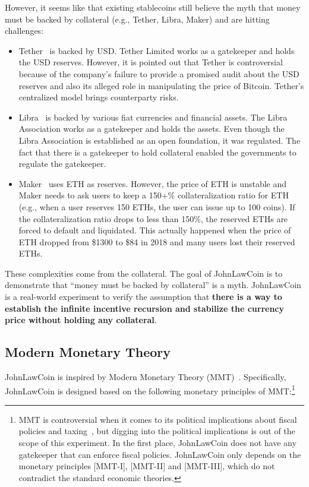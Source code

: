 \documentclass[dvipdfmx,a4paper]{article}
\begin{document}
However, it seems like that existing stablecoins still believe the myth that money must be backed by collateral (e.g., Tether, Libra, Maker) and are hitting challenges:

\begin{itemize}
\item Tether~\cite{tether} is backed by USD. Tether Limited works as a gatekeeper and holds the USD reserves. However, it is pointed out that Tether is controversial because of the company's failure to provide a promised audit about the USD reserves and also its alleged role in manipulating the price of Bitcoin. Tether's centralized model brings counterparty risks.
\item Libra~\cite{libra} is backed by various fiat currencies and financial assets. The Libra Association works as a gatekeeper and holds the assets. Even though the Libra Association is established as an open foundation, it was regulated. The fact that there is a gatekeeper to hold collateral enabled the governments to regulate the gatekeeper.
\item Maker~\cite{makerdao} uses ETH as reserves. However, the price of ETH is unstable and Maker needs to ask users to keep a 150+\% collateralization ratio for ETH (e.g., when a user reserves 150 ETHs, the user can issue up to 100 coins). If the collateralization ratio drops to less than 150\%, the reserved ETHs are forced to default and liquidated. This actually happened when the price of ETH dropped from \$1300 to \$84 in 2018 and many users lost their reserved ETHs.
\end{itemize}

These complexities come from the collateral. The goal of JohnLawCoin is to demonstrate that ``money must be backed by collateral'' is a myth. JohnLawCoin is a real-world experiment to verify the assumption that \textbf{there is a way to establish the infinite incentive recursion and stabilize the currency price without holding any collateral}.

\subsection{Modern Monetary Theory}

JohnLawCoin is inspired by Modern Monetary Theory (MMT)~\cite{kelton2020deficit,mmt2016wray}. Specifically, JohnLawCoin is designed based on the following monetary principles of MMT:\footnote{MMT is controversial when it comes to its political implications about fiscal policies and taxing~\cite{palley2015money}, but digging into the political implications is out of the scope of this experiment. In the first place, JohnLawCoin does not have any gatekeeper that can enforce fiscal policies. JohnLawCoin only depends on the monetary principles [MMT-I], [MMT-II] and [MMT-III], which do not contradict the standard economic theories.}
\end{document}
